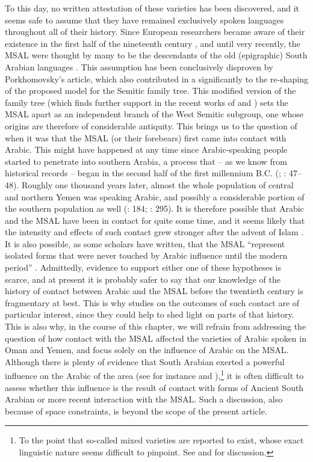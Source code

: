 \documentclass[output=paper]{langsci/langscibook}
\begin{document}
To this day, no written attestation of these varieties has been discovered, and it seems safe to assume that they have remained exclusively spoken languages throughout all of their history. Since European researchers became aware of their existence in the first half of the nineteenth century \citep{Wellsted1837}, and until very recently, the MSAL were thought by many to be the descendants of the old (epigraphic) South Arabian languages \citep[16]{Rubin2014}. This assumption has been conclusively disproven by Porkhomovsky’s \citeyear{Porkhomovsky1997} article, which also contributed in a significantly to the re-shaping of the proposed model for the Semitic family tree. This modified version of the family tree (which finds further support in the recent works of \citealt{Kogan2015} and \citealt{Edzard2017}) sets the MSAL apart as an independent branch of the West Semitic subgroup, one whose origins are therefore of considerable antiquity. This brings us to the question of when it was that the MSAL (or their forebears) first came into contact with Arabic. This might have happened at any time since Arabic-speaking people started to penetrate into southern Arabia, a process that – as we know from historical records – began in the second half of the first millennium B.C. (\citealt{Robin1991}; \citealt{Hoyland2001}: 47--48). Roughly one thousand years later, almost the whole population of central and northern Yemen was speaking Arabic, and possibly a considerable portion of the southern population as well (\citealt{Beeston1981}: 184; \citealt{Zammit2011}: 295). It is therefore possible that Arabic and the MSAL have been in contact for quite some time, and it seems likely that the intensity and effects of such contact grew stronger after the advent of Islam \citep[247]{Lonnet2011}. It is also possible, as some scholars have written, that the MSAL “represent isolated forms that were never touched by Arabic influence until the modern period” \citep[127]{Versteegh2014book}. Admittedly, evidence to support either one of these hypotheses is scarce, and at present it is probably safer to say that our knowledge of the history of contact between Arabic and the MSAL before the twentieth century is fragmentary at best. This is why studies on the outcomes of such contact are of particular interest, since they could help to shed light on parts of that history. This is also why, in the course of this chapter, we will refrain from addressing the question of how contact with the MSAL affected the varieties of Arabic spoken in Oman and Yemen, and focus solely on the influence of Arabic on the MSAL. Although there is plenty of evidence that South Arabian exerted a powerful influence on the Arabic of the area (see for instance \citealt{Retsö2000} and \citealt{Watson2018}),\footnote{To the point that so-called mixed varieties are reported to exist, whose exact linguistic nature seems difficult to pinpoint. See \citet{WatsonEtAl2006} and \citet{Watson2011SAYemeni} for discussion.} it is often difficult to assess whether this influence is the result of contact with forms of Ancient South Arabian or more recent interaction with the MSAL. Such a discussion, also because of space constraints, is beyond the scope of the present article.
\end{document}
